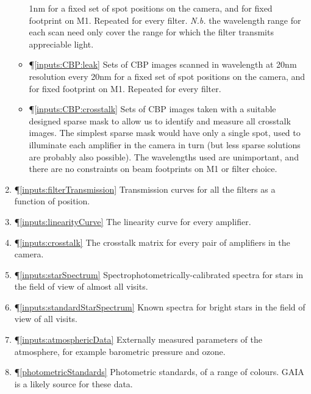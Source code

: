 \documentclass[12pt]{article}
\makeatletter
\newcommand{\Nb}{\textit{N.b.}\xspace}
\newcommand{\addLabel}[1]{\P \label{#1}\ref{#1}}
\newcommand{\addMyLabel}[2]{\P \myLabel{#1}{#2}\ref{#1}}
\newcommand{\myLabel}[2]{\def\@currentlabel{#2}\label{#1}}
\makeatother
\begin{document}
\begin{enumerate}
\begin{itemize}
       1nm for a fixed set of spot positions on the camera, and for fixed footprint on M1.  Repeated for
       every filter. \Nb the wavelength range for each scan need only cover the range for which the filter
       transmits appreciable light.
     \item\addMyLabel{inputs:CBP:leak}{\arabic{enumi}e} Sets of CBP images scanned in wavelength at 20nm
       resolution every 20nm for a fixed set of spot positions on the camera, and for fixed footprint on M1.
       Repeated for every filter.
     \item\addMyLabel{inputs:CBP:crosstalk}{\arabic{enumi}f} Sets of CBP images taken with a suitable
       designed sparse mask to allow us to identify and measure all crosstalk images.  The simplest
       sparse mask would have only a single spot, used to illuminate each amplifier in the camera in
       turn (but less sparse solutions are probably also possible).  The wavelengths used are unimportant,
       and there are no constraints on beam footprints on M1 or filter choice.
     \end{itemize}
   \item\addLabel{inputs:filterTransmission} Transmission curves for all the filters as a function of position.
   \item\addLabel{inputs:linearityCurve}  The linearity curve for every amplifier.
   \item\addLabel{inputs:crosstalk}  The crosstalk matrix for every pair of amplifiers in the camera.
   \item\addLabel{inputs:starSpectrum}  Spectrophotometrically-calibrated spectra for stars in
     the field of view of almost all visits.
   \item\addLabel{inputs:standardStarSpectrum} Known spectra for bright stars in the field of view of all
     visits.
   \item\addLabel{inputs:atmosphericData}  Externally measured parameters of the atmosphere, for
     example barometric pressure and ozone.
   \item\addLabel{photometricStandards}  Photometric standards, of a range of colours.  GAIA is a likely
     source for these data.
\end{enumerate}


\end{document}
